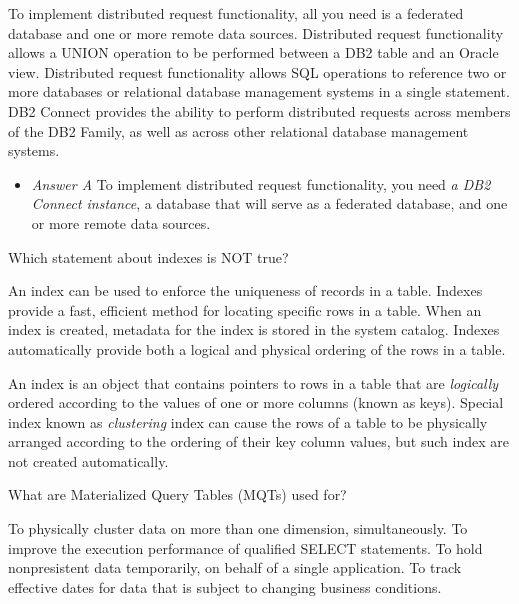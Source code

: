 \documentclass[answers, 11pt]{exam}
\begin{document}
\begin{questions}
\begin{choices}
	\CorrectChoice To implement distributed request functionality, all you need is a federated database and one
	or more remote data sources.
	\choice Distributed request functionality allows a UNION operation to be performed between a DB2 table and
	an Oracle view.
	\choice Distributed request functionality allows SQL operations to reference two or more databases or 
	relational database management systems in a single statement.
	\choice DB2 Connect provides the ability to perform distributed requests across members of the DB2 Family,
	as well as across other relational database management systems.
\end{choices}

\begin{solution}
	\begin{itemize}
		\item \textit{Answer A} To implement distributed request functionality, you need \textit{a DB2 Connect instance},
		a database that will serve as a federated database, and one or more remote data sources.
	\end{itemize}
\end{solution}

\question[1]
Which statement about indexes is NOT true?
\begin{choices}
	\choice An index can be used to enforce the uniqueness of records in a table.
	\choice Indexes provide a fast, efficient method for locating specific rows in a table.
	\choice When an index is created, metadata for the index is stored in the system catalog.
	\CorrectChoice Indexes automatically provide both a logical and physical ordering of the rows in a table.
\end{choices}

\begin{solution}
	An index is an object that contains pointers to rows in a table that are \textit{logically} ordered according to the values
	of one or more columns (known as keys). Special index known as \textit{clustering} index can cause the rows of a table to be physically
	arranged according to the ordering of their key column values, but such index are not created automatically. 
\end{solution}

\question[1]
What are Materialized Query Tables (MQTs) used for?
\begin{choices}
	\choice To physically cluster data on more than one dimension, simultaneously.
	\CorrectChoice To improve the execution performance of qualified SELECT statements.
	\choice To hold nonpresistent data temporarily, on behalf of a single application.
	\choice To track effective dates for data that is subject to changing business conditions.
\end{choices}


\end{questions}
\end{document}
